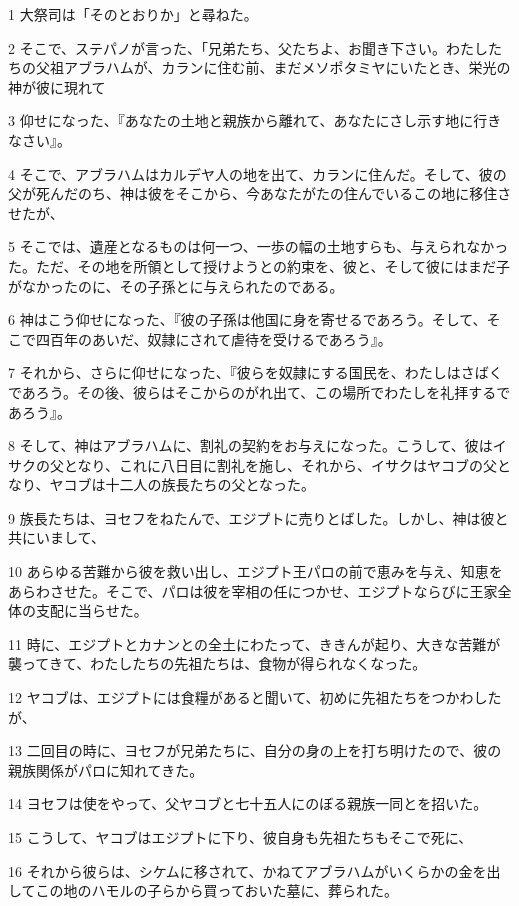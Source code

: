 \par 1 大祭司は「そのとおりか」と尋ねた。
\par 2 そこで、ステパノが言った、「兄弟たち、父たちよ、お聞き下さい。わたしたちの父祖アブラハムが、カランに住む前、まだメソポタミヤにいたとき、栄光の神が彼に現れて
\par 3 仰せになった、『あなたの土地と親族から離れて、あなたにさし示す地に行きなさい』。
\par 4 そこで、アブラハムはカルデヤ人の地を出て、カランに住んだ。そして、彼の父が死んだのち、神は彼をそこから、今あなたがたの住んでいるこの地に移住させたが、
\par 5 そこでは、遺産となるものは何一つ、一歩の幅の土地すらも、与えられなかった。ただ、その地を所領として授けようとの約束を、彼と、そして彼にはまだ子がなかったのに、その子孫とに与えられたのである。
\par 6 神はこう仰せになった、『彼の子孫は他国に身を寄せるであろう。そして、そこで四百年のあいだ、奴隷にされて虐待を受けるであろう』。
\par 7 それから、さらに仰せになった、『彼らを奴隷にする国民を、わたしはさばくであろう。その後、彼らはそこからのがれ出て、この場所でわたしを礼拝するであろう』。
\par 8 そして、神はアブラハムに、割礼の契約をお与えになった。こうして、彼はイサクの父となり、これに八日目に割礼を施し、それから、イサクはヤコブの父となり、ヤコブは十二人の族長たちの父となった。
\par 9 族長たちは、ヨセフをねたんで、エジプトに売りとばした。しかし、神は彼と共にいまして、
\par 10 あらゆる苦難から彼を救い出し、エジプト王パロの前で恵みを与え、知恵をあらわさせた。そこで、パロは彼を宰相の任につかせ、エジプトならびに王家全体の支配に当らせた。
\par 11 時に、エジプトとカナンとの全土にわたって、ききんが起り、大きな苦難が襲ってきて、わたしたちの先祖たちは、食物が得られなくなった。
\par 12 ヤコブは、エジプトには食糧があると聞いて、初めに先祖たちをつかわしたが、
\par 13 二回目の時に、ヨセフが兄弟たちに、自分の身の上を打ち明けたので、彼の親族関係がパロに知れてきた。
\par 14 ヨセフは使をやって、父ヤコブと七十五人にのぼる親族一同とを招いた。
\par 15 こうして、ヤコブはエジプトに下り、彼自身も先祖たちもそこで死に、
\par 16 それから彼らは、シケムに移されて、かねてアブラハムがいくらかの金を出してこの地のハモルの子らから買っておいた墓に、葬られた。
